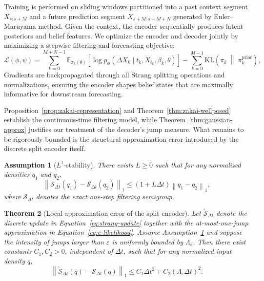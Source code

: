 \documentclass{article}
\newtheorem{theorem}{Theorem}
\newtheorem{assumption}[theorem]{Assumption}
\begin{document}
Training is performed on sliding windows partitioned into a past context segment $X_{s:s+M}$ and a future prediction segment $X_{s+M:s+M+N}$ generated by Euler--Maruyama method. Given the context, the encoder sequentially produces latent posteriors and belief features. We optimize the encoder and decoder jointly by maximizing a stepwise filtering-and-forecasting objective:
\[
\mathcal{L}(\phi,\psi)
=
\sum_{k=0}^{M+N-1}
\mathbb{E}_{\pi_k(\theta)}
\!\left[
\log p_{\phi}(\Delta X_k \mid t_k, X_{t_k}, \beta_k, \theta)
\right]
-
\sum_{k=0}^{M-1}
\mathrm{KL}\!\left(
\pi_k \;\middle\|\; \pi_k^{\mathrm{prior}}
\right),
\]
Gradients are backpropagated through all Strang splitting operations and normalizations, ensuring the encoder shapes belief states that are maximally informative for downstream forecasting.

Proposition~\ref{prop:zakai-representation} and Theorem~\ref{thm:zakai-wellposed} establish the continuous-time filtering model, while Theorem~\ref{thm:gaussian-approx} justifies our treatment of the decoder's jump measure. What remains to be rigorously bounded is the structural approximation error introduced by the discrete split encoder itself.

\begin{assumption}[$L^1$-stability]
\label{ass:l1-stability}
There exists $L \ge 0$ such that for any normalized densities $q_1$ and $q_2$,
\begin{equation*}
\left\lVert
\mathcal{S}_{\Delta t}(q_1)-\mathcal{S}_{\Delta t}(q_2)
\right\rVert_1
\le
(1+L\Delta t)
\left\lVert q_1-q_2 \right\rVert_1,
\end{equation*}
where $\mathcal{S}_{\Delta t}$ denotes the exact one-step filtering semigroup.
\end{assumption}

\begin{theorem}[Local approximation error of the split encoder]
\label{thm:local-error}
Let $\widetilde{\mathcal{S}}_{\Delta t}$ denote the discrete update in Equation~\eqref{eq:strang-update} together with the at-most-one-jump approximation in Equation~\eqref{eq:c-likelihood}. Assume Assumption~\ref{ass:l1-stability} and suppose the intensity of jumps larger than $\varepsilon$ is uniformly bounded by $\Lambda_{\varepsilon}$. Then there exist constants $C_1,C_2>0$, independent of $\Delta t$, such that for any normalized input density $q$,
\begin{equation*}
\left\lVert
\widetilde{\mathcal{S}}_{\Delta t}(q)-\mathcal{S}_{\Delta t}(q)
\right\rVert_1
\le
C_1\Delta t^2
+
C_2(\Lambda_{\varepsilon}\Delta t)^2.
\end{equation*}
\end{theorem}
\end{document}
